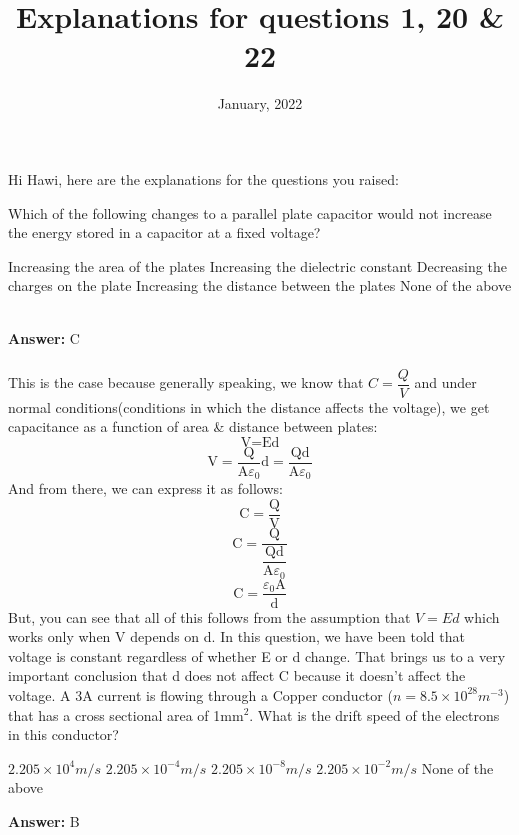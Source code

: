 \documentclass[11pt,addpoints]{exam}
\date{January, 2022}\usepackage{geometry}
\begin{document}
	\title{Explanations for questions 1, 20 \& 22}
	\maketitle 
	
	Hi Hawi, here are the explanations for the questions you raised:
	\begin{questions}
					\question Which of the following changes to a parallel plate capacitor would not increase the energy stored in a capacitor at a fixed voltage?\\
					\begin{oneparchoices}
						\choice Increasing the area of the plates
						\choice Increasing the dielectric constant
						\choice Decreasing the charges on the plate
						\choice Increasing the distance between the plates
						\choice None of the above
					\end{oneparchoices}
					\\ \textbf{Answer:} C \\ \\
					This is the case because generally speaking, we know that $C=\dfrac{Q}{V}$ and under normal conditions(conditions in which the distance affects the voltage), we get capacitance as a function of area \& distance between plates:
					$$\text{V}=\text{Ed}$$
					$$\text{V}=\dfrac{\text{Q}}{\text{A}\varepsilon_0}\text{d}=\dfrac{\text{Qd}}{\text{A}\varepsilon_0}$$
					And from there, we can express it as follows:
					$$\text{C}=\dfrac{\text{Q}}{\text{V}}$$
					$$\text{C}=\dfrac{\text{Q}}{\dfrac{\text{Qd}}{\text{A}\varepsilon_0}}$$
					$$\text{C}=\dfrac{\varepsilon_0\text{A}}{\text{d}}$$
					But, you can see that all of this follows from the assumption that $V=Ed$ which works only when V depends on d. In this question, we have been told that voltage is constant regardless of whether E or d change. That brings us to a very important conclusion that d does not affect C because it doesn't affect the voltage.
					\question A 3A current is flowing through a Copper conductor ($n= 8.5\times10^{28}m^{-3}$) that has a cross sectional area of 1mm$^2$. What is the drift speed of the electrons in this conductor?\\
					\begin{oneparchoices}
						\choice $2.205\times10^{4}m/s$
						\choice $2.205\times10^{-4}m/s$
						\choice $2.205\times10^{-8}m/s$
						\choice $2.205\times10^{-2}m/s$
						\choice None of the above
					\end{oneparchoices} \textbf{Answer:} B \\ \\

\end{questions}
\end{document}
